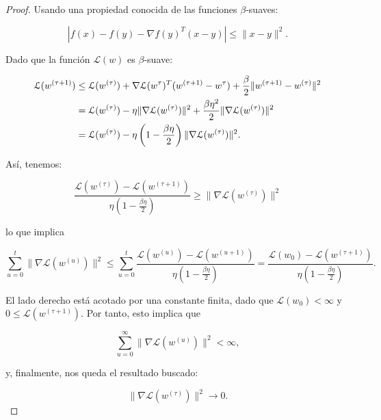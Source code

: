 \begin{proof}
  Usando una propiedad conocida de las funciones $\beta$-suaves:

  \[
      | f(x) - f(y) - \nabla f(y)^{T} (x-y) | \leq \| x - y \|^2.
  \]  

  Dado que la función $\mathcal{L}(w)$ es $\beta$-suave:

  \begin{align}
      \mathcal{L} (w^{(\tau + 1)}) &\leq \mathcal{L} (w^{(\tau)}) + \nabla \mathcal{L} (w^{\tau})^{T} (w^{(\tau + 1)} - w^{\tau}) + \frac{\beta}{2} \|w^{(\tau + 1)} - w^{(\tau)}\|^2 \notag \\
      &= \mathcal{L} (w^{(\tau)}) - \eta \|\nabla \mathcal{L} (w^{(\tau)})\|^2 + \frac{\beta \eta^2}{2} \|\nabla \mathcal{L} (w^{(\tau)})\|^2 \notag \\
      &= \mathcal{L} (w^{(\tau)}) - \eta \left( 1 - \frac{\beta \eta}{2} \right) \|\nabla \mathcal{L} (w^{(\tau)})\|^2.
  \end{align}

  Así, tenemos:

  \[
      \frac{\mathcal{L} (w^{(\tau)}) - \mathcal{L} (w^{(\tau + 1)})}{\eta \left( 1 - \frac{\beta \eta}{2} \right)} \geq \|\nabla \mathcal{L} (w^{(\tau)})\|^2
  \]

  lo que implica

  \[
      \sum_{u=0}^{t} \|\nabla \mathcal{L} (w^{(u)})\|^2 \leq \sum_{u=0}^{t} \frac{\mathcal{L} (w^{(u)}) - \mathcal{L} (w^{(u+1)})}{\eta \left( 1 - \frac{\beta \eta}{2} \right)} = \frac{\mathcal{L} (w_0) - \mathcal{L} (w^{(\tau + 1)})}{\eta \left( 1 - \frac{\beta \eta}{2} \right)}.
  \]

  El lado derecho está acotado por una constante finita, dado que $\mathcal{L} (w_0) < \infty$ y $0 \leq \mathcal{L} (w^{(\tau + 1)})$. Por tanto, esto implica que

  \[
      \sum_{u=0}^{\infty} \|\nabla \mathcal{L} (w^{(u)})\|^2 < \infty,
  \]

  y, finalmente, nos queda el resultado buscado:

  \[
      \|\nabla \mathcal{L} (w^{(\tau)})\|^2 \to 0.
  \]
\end{proof}

\endinput
